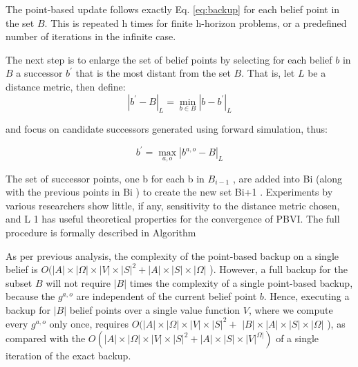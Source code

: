 The point-based update follows exactly Eq. \ref{eq:backup} for each belief point in the set $B$. 
This is repeated h times for finite h-horizon problems, or a predefined number of iterations in the 
infinite case.

The next step is to enlarge the set of belief points by selecting for each belief \(b\) in \(B\) 
a successor \(b^{\prime}\) that is the most distant from the set \(B\). That is, let \(L\) be a 
distance metric, then define:
\[
\left|b^{\prime}-B\right|_{L}=\min _{b \in B}\left|b-b^{\prime}\right|_{L}
\]

and focus on candidate successors generated using forward simulation, thus:

\[
b^{\prime}=\max _{a, o}\left|b^{a, o}-B\right|_{L}
\] 

The set of successor points, one b for each b in $B_{i-1}$ , are added into Bi (along with the previous
points in Bi ) to create the new set Bi+1 . Experiments by various researchers show little, if
any, sensitivity to the distance metric chosen, and L 1 has useful theoretical properties for the
convergence of PBVI. The full procedure is formally described in Algorithm



As per previous analysis, the complexity of the point-based backup on a single belief is 
\(O(|A| \times|\Omega| \times|V| \times|S|^{2}+|A| \times|S| \times|\Omega|\) ).
However, a full backup for the subset \(B\) will not require \(|B|\) times the complexity of a
single point-based backup, because the \(g^{a, o}\) are independent of the current belief point \(b\).
Hence, executing a backup for \(|B|\) belief points over a single value function \(V\), where we
compute every \(g^{a, o}\) only once, requires \(O(|A| \times|\Omega| \times|V| \times|S|^{2}+\)
\(|B| \times|A| \times|S| \times|\Omega|\) ), as compared with the \(O(|A| \times|\Omega| \times|V| \times|S|^{2}+|A| \times|S| \times|V|^{\Omega|})\)
of a single iteration of the exact backup. 

